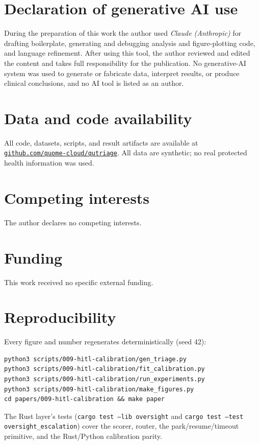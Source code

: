 \documentclass[11pt]{article}
\begin{document}
\section*{Declaration of generative AI use}
During the preparation of this work the author used \emph{Claude (Anthropic)} for
drafting boilerplate, generating and debugging analysis and figure-plotting code, and
language refinement. After using this tool, the author reviewed and edited the content
and takes full responsibility for the publication. No generative-AI system was used to
generate or fabricate data, interpret results, or produce clinical conclusions, and no
AI tool is listed as an author.

\section*{Data and code availability}
All code, datasets, scripts, and result artifacts are available at
\href{https://github.com/quome-cloud/qutriage}{\nolinkurl{github.com/quome-cloud/qutriage}}.
All data are synthetic; no real protected health information was used.

\section*{Competing interests}
The author declares no competing interests.

\section*{Funding}
This work received no specific external funding.

\appendix
\section{Reproducibility}\label{app:repro}
Every figure and number regenerates deterministically (seed 42):
\begin{lstlisting}[style=housespecyamlbare]
python3 scripts/009-hitl-calibration/gen_triage.py
python3 scripts/009-hitl-calibration/fit_calibration.py
python3 scripts/009-hitl-calibration/run_experiments.py
python3 scripts/009-hitl-calibration/make_figures.py
cd papers/009-hitl-calibration && make paper
\end{lstlisting}
The Rust layer's tests (\texttt{cargo test --lib oversight} and
\texttt{cargo test --test oversight\_escalation}) cover the scorer, router, the
park/resume/timeout primitive, and the Rust/Python calibration parity.

\clearpage


\end{document}
